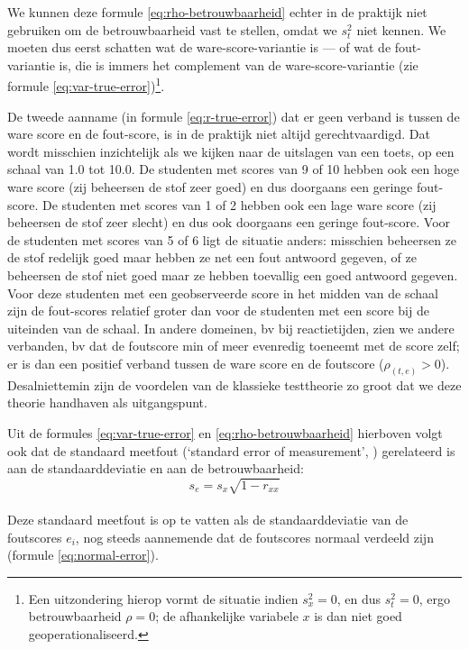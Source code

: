 \documentclass[
]{book}
\begin{document}
We kunnen deze formule \eqref{eq:rho-betrouwbaarheid} echter in de praktijk niet gebruiken
om de betrouwbaarheid vast te stellen, omdat we \(s^2_t\) niet kennen. We
moeten dus eerst schatten wat de ware-score-variantie is --- of wat de
fout-variantie is, die is immers het complement van de
ware-score-variantie (zie
formule \eqref{eq:var-true-error})\footnote{Een uitzondering hierop vormt de situatie indien \(s^2_x=0\), en dus \(s^2_t=0\), ergo betrouwbaarheid \(\rho=0\); de afhankelijke variabele \(x\) is dan niet goed geoperationaliseerd.}.

De tweede aanname (in formule \eqref{eq:r-true-error}) dat er geen verband is tussen de ware
score en de fout-score, is in de praktijk niet altijd gerechtvaardigd.
Dat wordt misschien inzichtelijk als we kijken naar de uitslagen van een
toets, op een schaal van 1.0 tot 10.0. De studenten met scores van 9 of
10 hebben ook een hoge ware score (zij beheersen de stof zeer goed) en
dus doorgaans een geringe fout-score. De studenten met scores van 1 of 2
hebben ook een lage ware score (zij beheersen de stof zeer slecht) en
dus ook doorgaans een geringe fout-score. Voor de studenten met scores
van 5 of 6 ligt de situatie anders: misschien beheersen ze de stof
redelijk goed maar hebben ze net een fout antwoord gegeven, of ze
beheersen de stof niet goed maar ze hebben toevallig een goed antwoord
gegeven. Voor deze studenten met een geobserveerde score in het midden
van de schaal zijn de fout-scores relatief groter dan voor de studenten
met een score bij de uiteinden van de schaal. In andere domeinen, bv bij
reactietijden, zien we andere verbanden, bv dat de foutscore min of meer
evenredig toeneemt met de score zelf; er is dan een positief verband
tussen de ware score en de foutscore (\(\rho_{(t,e)}>0\)). Desalniettemin
zijn de voordelen van de klassieke testtheorie zo groot dat we deze
theorie handhaven als uitgangspunt.

Uit de formules \eqref{eq:var-true-error} en \eqref{eq:rho-betrouwbaarheid}
hierboven volgt ook dat de standaard
meetfout (`standard error of measurement', ) gerelateerd is aan de
standaarddeviatie en aan de betrouwbaarheid:
\begin{equation}
   \label{eq:standaard-meetfout}
    s_e = s_x \sqrt{1-r_{xx}}
\end{equation}\\
Deze standaard meetfout is op te vatten
als de standaarddeviatie van de foutscores \(e_i\), nog steeds aannemende
dat de foutscores normaal verdeeld zijn (formule \eqref{eq:normal-error}).
\end{document}
